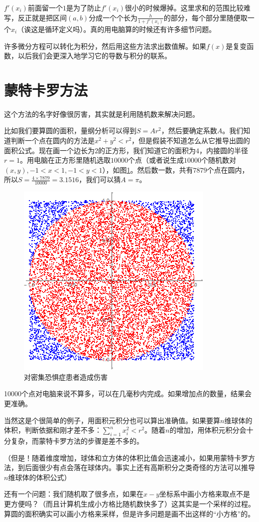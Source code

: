 $f'(x_i)$前面留一个$1$是为了防止$f'(x_i)$很小的时候爆掉。这里求和的范围比较难写，反正就是把区间$(a,b)$分成一个个长为$\frac{h}{1+f'(x_i)}$的部分，每个部分里随便取一个$x_i$（诶这是循环定义吗）。真的用电脑算的时候还有许多细节问题。

许多微分方程可以转化为积分，然后用这些方法求出数值解。如果$f(x)$是复变函数，以后我们会更深入地学习它的导数与积分的联系。
\section{蒙特卡罗方法}
这个方法的名字好像很厉害，其实就是利用随机数来解决问题。

比如我们要算圆的面积，量纲分析可以得到$S=A r^2$，然后要确定系数$A$。我们知道判断一个点在圆内的方法是$x^2+y^2<r^2$，但是假装不知道怎么从它推导出圆的面积公式。现在画一个边长为$2$的正方形，我们知道它的面积为$4$，内接圆的半径$r=1$。用电脑在正方形里随机选取$10000$个点（或者说生成$10000$个随机数对$(x,y),-1<x<1,-1<y<1$），如图\ref{fig-monte-carlo-circle}。然后数一数，共有$7879$个点在圆内，所以$S=\frac{4 \times 7879}{10000}=3.1516$，我们可以猜$A=\pi$。
\begin{figure}[htb]
\centering
\includegraphics[width=0.33\linewidth]{fig/monte-carlo-circle.png}
\caption{对密集恐惧症患者造成伤害}
\label{fig-monte-carlo-circle}
\end{figure}

10000个点对电脑来说不算多，可以在几毫秒内完成。如果增加点的数量，结果会更准确。

当然这是个很简单的例子，用面积元积分也可以算出准确值。如果要算$n$维球体的体积，判断依据和刚才差不多：$\sum_{i=1}^n x_i^2<r^2$。随着$n$的增加，用体积元积分会十分复杂，而蒙特卡罗方法的步骤是差不多的。

（但是！随着维度增加，球体和立方体的体积比值会迅速减小，如果用蒙特卡罗方法，到后面很少有点会落在球体内。事实上还有高斯积分之类奇怪的方法可以推导$n$维球体的体积公式）

还有一个问题：我们随机取了很多点，如果在$x-y$坐标系中画小方格来取点不是更方便吗？（而且计算机生成小方格比随机数快多了）这其实是一个采样的过程。算圆的面积确实可以画小方格来采样，但是许多问题是画不出这样的“小方格”的。

